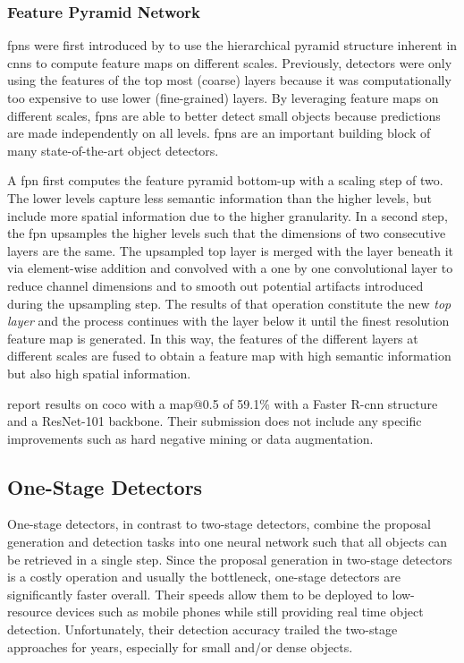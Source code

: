 \documentclass[draft,final]{vutinfth} %
\begin{document}
\subsubsection{Feature Pyramid Network}
\label{sssec:theory-fpn}

\glspl{fpn} were first introduced by \textcite{lin2017} to use the
hierarchical pyramid structure inherent in \glspl{cnn} to compute
feature maps on different scales. Previously, detectors were only
using the features of the top most (coarse) layers because it was
computationally too expensive to use lower (fine-grained) layers. By
leveraging feature maps on different scales, \glspl{fpn} are able to
better detect small objects because predictions are made independently
on all levels. \glspl{fpn} are an important building block of many
state-of-the-art object detectors.

A \gls{fpn} first computes the feature pyramid bottom-up with a
scaling step of two. The lower levels capture less semantic information
than the higher levels, but include more spatial information due to
the higher granularity. In a second step, the \gls{fpn} upsamples the
higher levels such that the dimensions of two consecutive layers are
the same. The upsampled top layer is merged with the layer beneath it
via element-wise addition and convolved with a one by one
convolutional layer to reduce channel dimensions and to smooth out
potential artifacts introduced during the upsampling step. The results
of that operation constitute the new \emph{top layer} and the process
continues with the layer below it until the finest resolution feature
map is generated. In this way, the features of the different layers at
different scales are fused to obtain a feature map with high semantic
information but also high spatial information.

\textcite{lin2017} report results on \gls{coco} with a \gls{map}@0.5
of 59.1\% with a Faster R-\gls{cnn} structure and a ResNet-101
backbone. Their submission does not include any specific improvements
such as hard negative mining \cite{shrivastava2016} or data
augmentation.

\subsection{One-Stage Detectors}
\label{ssec:theory-one-stage}

One-stage detectors, in contrast to two-stage detectors, combine the
proposal generation and detection tasks into one neural network such
that all objects can be retrieved in a single step. Since the proposal
generation in two-stage detectors is a costly operation and usually
the bottleneck, one-stage detectors are significantly faster
overall. Their speeds allow them to be deployed to low-resource
devices such as mobile phones while still providing real time object
detection. Unfortunately, their detection accuracy trailed the
two-stage approaches for years, especially for small and/or dense
objects.
\end{document}

